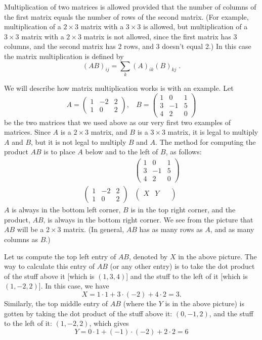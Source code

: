 \documentclass[12pt]{article}
\begin{document}
Multiplication of two matrices is allowed provided that the number of
columns of the first matrix equals the number of rows of the second
matrix. (For example, multiplication of a $2 \times 3$ matrix with a $3
\times 3$ is allowed, but multiplication of a $3 \times 3$ matrix with a
$2 \times 3$ matrix is not allowed, since the first matrix has 3
columns, and the second matrix has 2 rows, and 3 doesn't equal 2.)
In this case the matrix multiplication is defined by
$$(AB)_{ij}=\sum_k (A)_{ik} (B)_{kj}\;.$$

We will describe how matrix multiplication works is with an
example. Let
$$
A =
\begin{pmatrix}
1 & -2 & 2 \\
1 & 0 & 2
\end{pmatrix},\ \ \ \
B =
\begin{pmatrix}
1 & 0 & 1 \\
3 & -1 & 5 \\
4 & 2 & 0
\end{pmatrix}
$$
be the two matrices that we used above as our very first two examples of
matrices. Since $A$ is a $2 \times 3$ matrix, and $B$ is a $3 \times 3$
matrix, it is legal to multiply $A$ and $B$, but it is not legal to
multiply $B$ and $A$. The method for computing the product $AB$ is to
place $A$ below and to the left of $B$, as follows:
$$
\begin{matrix}
& \begin{pmatrix}
1 & 0 & 1 \\
3 & -1 & 5 \\
4 & 2 & 0
\end{pmatrix}
\\
\begin{pmatrix}
1 & -2 & 2 \\
1 & 0 & 2
\end{pmatrix} &
\begin{pmatrix}
X & Y & \ \ \\
\ \ &\ \ &\ \
\end{pmatrix}
\end{matrix}
$$
$A$ is always in the bottom left corner, $B$ is in the top right corner,
and the product, $AB$, is always in the bottom right corner. We see from
the picture that $AB$ will be a $2 \times 3$ matrix. (In general, $AB$
has as many rows as $A$, and as many columns as $B$.)

Let us compute the top left entry of $AB$, denoted by $X$ in the above
picture. The way to calculate this entry of $AB$ (or any other entry) is
to take the dot product of the stuff above it [which is $(1,3,4)$] and
the stuff to the left of it [which is $(1,-2,2)$]. In this case, we have
$$
X = 1 \cdot 1 + 3 \cdot (-2) + 4 \cdot 2 = 3.
$$
Similarly, the top middle entry of $AB$ (where the $Y$ is in the above
picture) is gotten by taking the dot product of the stuff above it:
$(0,-1,2)$, and the stuff to the left of it: $(1,-2,2)$, which gives
$$
Y = 0\cdot 1 + (-1) \cdot (-2) + 2 \cdot 2 = 6
$$
\end{document}
